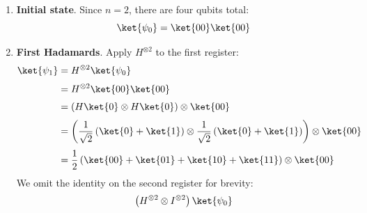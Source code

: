 \begin{enumerate}[label={\textbf{Step \arabic*.}}, leftmargin=2cm]
    \item \textbf{Initial state}. Since $n=2$, there are four qubits total:
        \begin{equation*}
            \ket{\psi_0} = \ket{00} \ket{00}
        \end{equation*}

    \item \textbf{First Hadamards}. Apply $H^{\otimes 2}$ to the first register:
        \begin{align*}
            \ket{\psi_1} &= H^{\otimes 2} \ket{\psi_0} \\[.3em]
            &= H^{\otimes 2} \ket{00} \ket{00} \\[.3em]
            &= \left(H \ket{0} \otimes H \ket{0}\right) \otimes \ket{00} \\[.3em]
            &= \left(
                \frac{1}{\sqrt{2}} \left(\ket{0} + \ket{1}\right) \otimes
                \frac{1}{\sqrt{2}} \left(\ket{0} + \ket{1}\right)
            \right) \otimes \ket{00} \\[.3em]
            &= \frac{1}{2} \left(
                \ket{00} + \ket{01} + \ket{10} + \ket{11}
            \right) \otimes \ket{00}
        \end{align*}
        We omit the identity on the second register for brevity:
        \begin{equation}
            \left(H^{\otimes 2} \otimes I^{\otimes 2}\right) \ket{\psi_0}
        \end{equation}


\end{enumerate}
